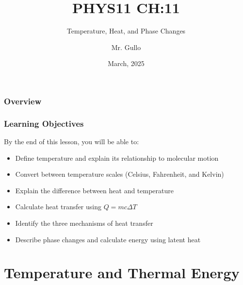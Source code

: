 \documentclass{beamer}
\title[Thermal Physics]{PHYS11 CH:11}
\subtitle{Temperature, Heat, and Phase Changes}
\author[Mr. Gullo]{Mr. Gullo}
\date[March 2025]{March, 2025}
\institute{Physics Department}
\begin{document}
\begin{frame}
    \titlepage
\end{frame}

\begin{frame}
    \frametitle{Overview}
    \tableofcontents
\end{frame}

\begin{frame}
    \frametitle{Learning Objectives}
    \begin{block}{By the end of this lesson, you will be able to:}
        \begin{itemize}
            \item Define temperature and explain its relationship to molecular motion
            \item Convert between temperature scales (Celsius, Fahrenheit, and Kelvin)
            \item Explain the difference between heat and temperature
            \item Calculate heat transfer using $Q = mc\Delta T$
            \item Identify the three mechanisms of heat transfer
            \item Describe phase changes and calculate energy using latent heat
        \end{itemize}
    \end{block}
\end{frame}

\section{Temperature and Thermal Energy}
\end{document}
